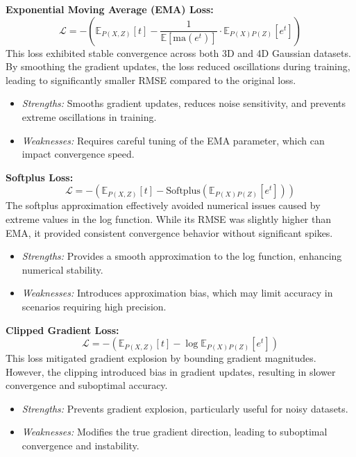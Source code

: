 \documentclass[lettersize,journal]{IEEEtran}
\begin{document}
    \textbf{Exponential Moving Average (EMA) Loss:} 
    $$\mathcal L = - \left( \mathbb{E}_{P(X, Z)}[t] - \frac{1}{\mathbb{E}[\text{ma}(e^{t})]}\cdot \mathbb{E}_{P(X)P(Z)}\left[e^{t}\right] \right)$$
    This loss exhibited stable convergence across both 3D and 4D Gaussian datasets. By smoothing the gradient updates, the loss reduced oscillations during training, leading to significantly smaller RMSE compared to the original loss.
    \begin{itemize}
        \item \textit{Strengths:} Smooths gradient updates, reduces noise sensitivity, and prevents extreme oscillations in training.
        \item \textit{Weaknesses:} Requires careful tuning of the EMA parameter, which can impact convergence speed.
    \end{itemize}
    
    \textbf{Softplus Loss:}
  $$\mathcal{L} = - \left( \mathbb{E}_{P(X, Z)}[t] - \text{Softplus}\left(\mathbb{E}_{P(X)P(Z)}[e^t]\right) \right)$$
  The softplus approximation effectively avoided numerical issues caused by extreme values in the log function. While its RMSE was slightly higher than EMA, it provided consistent convergence behavior without significant spikes.
    \begin{itemize}
        \item \textit{Strengths:} Provides a smooth approximation to the log function, enhancing numerical stability.
        \item \textit{Weaknesses:} Introduces approximation bias, which may limit accuracy in scenarios requiring high precision.
    \end{itemize}
    
    \textbf{Clipped Gradient Loss:} 
  $$\mathcal{L} = - \left( \mathbb{E}_{P(X, Z)}[t] - \log \mathbb{E}_{P(X)P(Z)}[e^t] \right)$$
  This loss mitigated gradient explosion by bounding gradient magnitudes. However, the clipping introduced bias in gradient updates, resulting in slower convergence and suboptimal accuracy.
    \begin{itemize}
        \item \textit{Strengths:} Prevents gradient explosion, particularly useful for noisy datasets.
        \item \textit{Weaknesses:} Modifies the true gradient direction, leading to suboptimal convergence and instability.
    \end{itemize}
    
\end{document}
